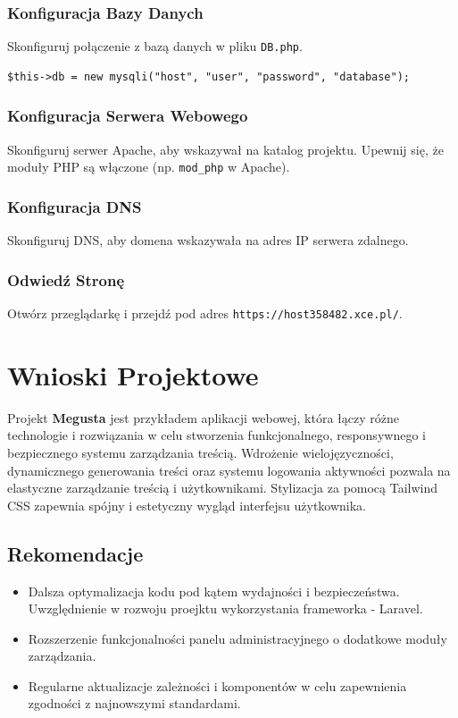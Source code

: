 \documentclass[a4paper,12pt]{report}
\begin{document}
\subsection{Konfiguracja Bazy Danych}
Skonfiguruj połączenie z bazą danych w pliku \texttt{DB.php}.
\begin{verbatim}
$this->db = new mysqli("host", "user", "password", "database");
\end{verbatim}

\subsection{Konfiguracja Serwera Webowego}
Skonfiguruj serwer Apache, aby wskazywał na katalog projektu. Upewnij się, że moduły PHP są włączone (np. \texttt{mod\_php} w Apache).

\subsection{Konfiguracja DNS}
Skonfiguruj DNS, aby domena wskazywała na adres IP serwera zdalnego.

\subsection{Odwiedź Stronę}
Otwórz przeglądarkę i przejdź pod adres \texttt{https://host358482.xce.pl/}.

\chapter{Wnioski Projektowe}
Projekt \textbf{Megusta} jest przykładem aplikacji webowej, która łączy różne technologie i rozwiązania w celu stworzenia funkcjonalnego, responsywnego i bezpiecznego systemu zarządzania treścią. Wdrożenie wielojęzyczności, dynamicznego generowania treści oraz systemu logowania aktywności pozwala na elastyczne zarządzanie treścią i użytkownikami. Stylizacja za pomocą Tailwind CSS zapewnia spójny i estetyczny wygląd interfejsu użytkownika.

\section{Rekomendacje}
\begin{itemize}
    \item Dalsza optymalizacja kodu pod kątem wydajności i bezpieczeństwa. Uwzględnienie w rozwoju proejktu wykorzystania frameworka - Laravel. 
    \item Rozszerzenie funkcjonalności panelu administracyjnego o dodatkowe moduły zarządzania.
    \item Regularne aktualizacje zależności i komponentów w celu zapewnienia zgodności z najnowszymi standardami.
\end{itemize}
\end{document}
